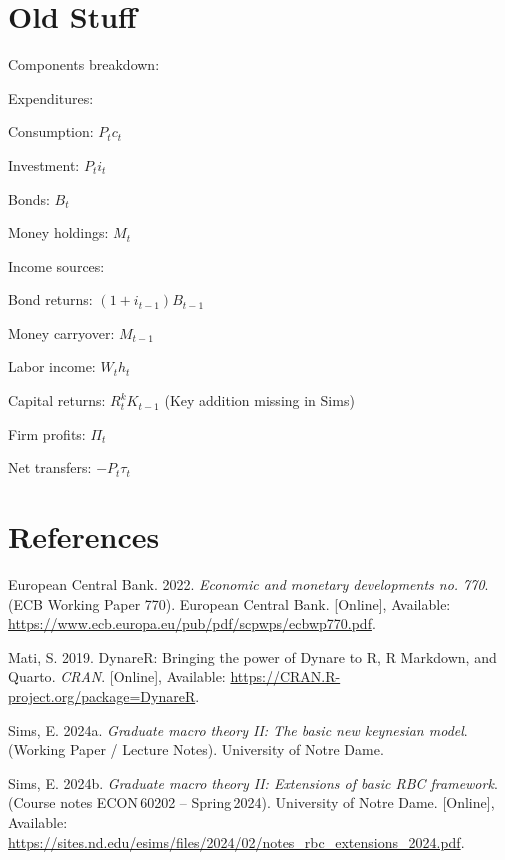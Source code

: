 \documentclass[11pt,preprint]{elsarticle}
\numberwithin{equation}{section}
\numberwithin{figure}{section}
\numberwithin{table}{section}
\newlength{\cslhangindent}
\newenvironment{CSLReferences}[2] %
{\begin{list}{}{%
	\setlength{\itemindent}{0pt}
	\setlength{\leftmargin}{0pt}
	\setlength{\parsep}{0pt}
	\ifodd #1
	\setlength{\leftmargin}{\cslhangindent}
	\setlength{\itemindent}{-1\cslhangindent}
	\fi
	\setlength{\itemsep}{#2\baselineskip}}}
{\end{list}}
\begin{document}
\newpage

\newpage

\section{Old Stuff}\label{old-stuff}

Components breakdown:

Expenditures:

Consumption: \(P_t c_t\)

Investment: \(P_t i_t\)

Bonds: \(B_t\)

Money holdings: \(M_t\)

Income sources:

Bond returns: \((1 + i_{t-1}) B_{t-1}\)

Money carryover: \(M_{t-1}\)

Labor income: \(W_t h_t\)

Capital returns: \(R_t^k K_{t-1}\) (Key addition missing in Sims)

Firm profits: \(\Pi_t\)

Net transfers: \(-P_t \tau_t\)

\newpage

\section*{References}\label{references}

\label{refs}
\begin{CSLReferences}{1}{1}
European Central Bank. 2022. \emph{Economic and monetary developments
no. 770}. (ECB Working Paper 770). European Central Bank. {[}Online{]},
Available: \url{https://www.ecb.europa.eu/pub/pdf/scpwps/ecbwp770.pdf}.

Mati, S. 2019. DynareR: Bringing the power of {Dynare} to {R}, {R
Markdown}, and {Quarto}. \emph{CRAN}. {[}Online{]}, Available:
\url{https://CRAN.R-project.org/package=DynareR}.

Sims, E. 2024a. \emph{Graduate macro theory II: The basic new keynesian
model}. (Working Paper / Lecture Notes). University of Notre Dame.

Sims, E. 2024b. \emph{Graduate macro theory II: Extensions of basic RBC
framework}. (Course notes ECON\,60202 -- Spring\,2024). University of
Notre Dame. {[}Online{]}, Available:
\url{https://sites.nd.edu/esims/files/2024/02/notes_rbc_extensions_2024.pdf}.

\end{CSLReferences}


\end{document}
